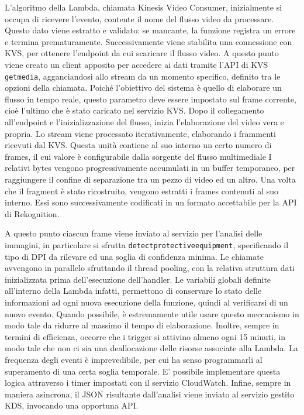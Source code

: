 L'algoritmo della Lambda, chiamata Kinesis Video Consumer, inizialmente si occupa di ricevere l'evento, contente il nome del flusso video da processare. Questo dato viene estratto e validato: se mancante, la funzione registra un errore e termina prematuramente. Successivamente viene stabilita una connessione con KVS, per ottenere l'endpoint da cui scaricare il flusso video. A questo punto viene creato un client apposito per accedere ai dati tramite l'API di KVS \texttt{get\textunderscore media}, agganciandosi allo stream da un momento specifico, definito tra le opzioni della chiamata. Poiché l'obiettivo del sistema è quello di elaborare un flusso in tempo reale, questo parametro deve essere impostato sul frame corrente, cioè l'ultimo che è stato caricato nel servizio KVS. Dopo il collegamento all'endpoint e l'inizializzazione del flusso, inizia l'elaborazione del video vera e propria. Lo stream viene processato iterativamente, elaborando i frammenti ricevuti dal KVS. %
Questa unità contiene al suo interno un certo numero di frames, il cui valore è configurabile dalla sorgente del flusso multimediale %
I relativi bytes vengono progressivamente accumulati in un buffer temporaneo, per raggiungere il confine di separazione tra un pezzo di video ed un altro. Una volta che il fragment è stato ricostruito, vengono estratti i frames contenuti al suo interno. Essi sono successivamente codificati in un formato accettabile per la API di Rekognition. 


A questo punto ciascun frame viene inviato al servizio per l'analisi delle immagini, in particolare si sfrutta \sloppy\texttt{detect\textunderscore protective\textunderscore equipment}\fussy, specificando il tipo di DPI da rilevare ed una soglia di confidenza minima. Le chiamate avvengono in parallelo sfruttando il thread pooling, con la relativa struttura dati inizializzata prima dell'esecuzione dell'handler. Le variabili globali definite all'interno della Lambda infatti, permettono di conservare lo stato delle informazioni ad ogni nuova esecuzione della funzione, quindi al verificarsi di un nuovo evento. Quando possibile, è estremamente utile usare questo meccanismo in modo tale da ridurre al massimo il tempo di elaborazione. Inoltre, sempre in termini di efficienza, occorre che i trigger si attivino almeno ogni 15 minuti, in modo tale che non ci sia una deallocazione delle risorse associate alla Lambda. La frequenza degli eventi è imprevedibile, per cui ha senso programmarli al superamento di una certa soglia temporale. E' possibile implementare questa logica attraverso i timer impostati con il servizio CloudWatch. Infine, sempre in maniera asincrona, il JSON risultante dall'analisi viene inviato al servizio gestito KDS, invocando una opportuna API.




